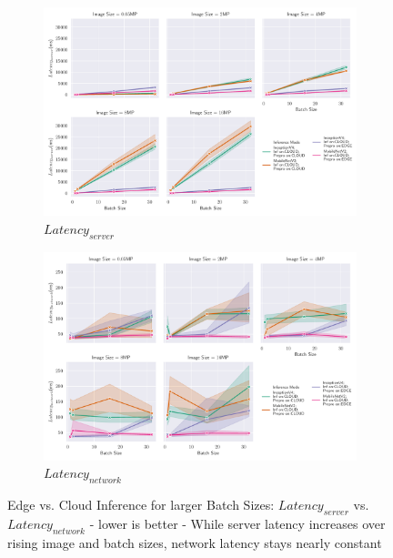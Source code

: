 \begin{figure}[!htb]
\centering
\begin{subfigure}[b]{0.95\textwidth}
   \includegraphics[width=1\linewidth]{./Bilder/single_plots/batch_size_plots/Effects_of_Batch_size_Inference_server_lat.pdf}
   \caption{$Latency_{server}$}
   \label{fig:BatchSizeServer} 
\end{subfigure}

\begin{subfigure}[b]{0.95\textwidth}
   \includegraphics[width=1\linewidth]{./Bilder/single_plots/batch_size_plots/Effects_of_Batch_size_Inference_network_lat.pdf}
   \caption{$Latency_{network}$}
   \label{fig:BatchSizeNetwork}
\end{subfigure}

\caption{Edge vs.  Cloud Inference for larger Batch Sizes:  $Latency_{server}$ vs. $Latency_{network}$ - lower is better - While server latency increases over rising image and batch sizes, network latency stays nearly constant}
\end{figure}



